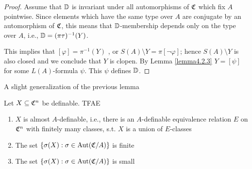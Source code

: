 \documentclass[11pt]{article}
\begin{document}
\begin{proof}
Assume that \(\mathbb{D}\) is invariant under all automorphisms of \(\mathfrak{C}\) which fix \(A\) pointwise. Since
elements which have the same type over \(A\) are conjugate by an automorphism of \(\mathfrak{C}\), this
means that \(\mathbb{D}\)-membership depends only on the type over \(A\), i.e., \(\mathbb{D}=(\pi\tau)^{-1}(Y)\).

This implies that \([\varphi]=\pi^{-1}(Y)\)
, or \(S(A)\setminus Y=\pi[\neg\varphi]\); hence \(S(A)\setminus Y\) is also closed and
we conclude that \(Y\) is clopen. By Lemma \ref{lemma4.2.3} \(Y=[\psi]\) for some \(L(A)\)-formula \(\psi\).
This \(\psi\) defines \(\mathbb{D}\).
\end{proof}


A slight generalization of the previous lemma
\begin{lemma}[]
\label{P2.13}
Let \(X\subseteq\mathfrak{C}^n\) be definable. TFAE
\begin{enumerate}
\item \(X\) is almost \(A\)-definable, i.e., there is an \(A\)-definable equivalence relation \(E\)
on \(\mathfrak{C}^n\) with finitely many classes, s.t. \(X\) is a union of \(E\)-classes
\item The set \(\{\sigma(X):\sigma\in\operatorname{\text{Aut}}(\mathfrak{C}/A)\}\) is finite
\item The set \(\{\sigma(X):\sigma\in\operatorname{\text{Aut}}(\mathfrak{C}/A)\}\) is small
\end{enumerate}
\end{lemma}
\end{document}
